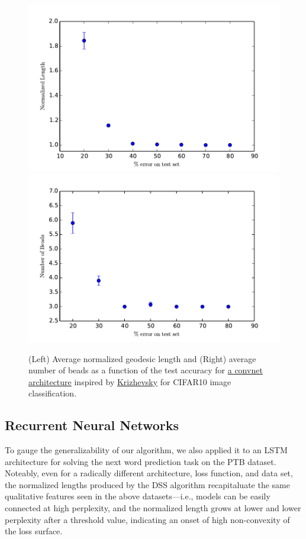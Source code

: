\begin{figure}
\label{CIFARfigs}
\centering
\includegraphics[width=.4\textwidth]{../Plots/normlengthCIFAR}
\includegraphics[width=.4\textwidth]{../Plots/numbeadsCIFAR}
\caption{(Left) Average normalized geodesic length and (Right) average number of beads as a function of the test accuracy for \href{github.com/danielfreeman11/convex-nets/tree/master/LaunchScripts/CIFAR10.ipynb}{a convnet architecture} inspired by \href{www.cs.toronto.edu/\%7Ekriz/cifar.html}{Krizhevsky} for CIFAR10 image classification.}
\end{figure}

\subsection{Recurrent Neural Networks}

 To gauge the generalizability of our algorithm, we also applied it to an LSTM architecture for solving the next word prediction task on the PTB dataset.  Noteably, even for a radically different architecture, loss function, and data set, the normalized lengths produced by the DSS algorithm recapitaluate the same qualitative features seen in the above datasets---i.e., models can be easily connected at high perplexity, and the normalized length grows at lower and lower perplexity after a threshold value, indicating an onset of high non-convexity of the loss surface. 

